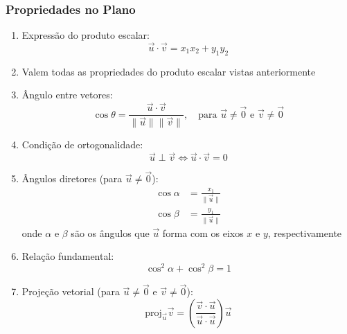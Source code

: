 \subsubsection*{Propriedades no Plano}
\begin{enumerate}[label=\alph*)]
  \item Expressão do produto escalar:
  \begin{equation}
    \vec{u} \cdot \vec{v} = x_1x_2 + y_1y_2
    \label{eq:produto_plano}
  \end{equation}
  
  \item Valem todas as propriedades do produto escalar vistas anteriormente
  
  \item Ângulo entre vetores:
  \begin{equation}
    \cos\theta = \frac{\vec{u} \cdot \vec{v}}{\|\vec{u}\|\|\vec{v}\|}, \quad \text{para } \vec{u} \neq \vec{0} \text{ e } \vec{v} \neq \vec{0}
    \label{eq:angulo_plano}
  \end{equation}
  
  \item Condição de ortogonalidade:
  \begin{equation}
    \vec{u} \perp \vec{v} \iff \vec{u} \cdot \vec{v} = 0
    \label{eq:ortog_plano}
  \end{equation}
  
  \item Ângulos diretores (para $\vec{u} \neq \vec{0}$):
  \begin{align}
    \cos\alpha &= \frac{x_1}{\|\vec{u}\|} \label{eq:cos_alpha} \\
    \cos\beta &= \frac{y_1}{\|\vec{u}\|} \label{eq:cos_beta}
  \end{align}
  onde $\alpha$ e $\beta$ são os ângulos que $\vec{u}$ forma com os eixos $x$ e $y$, respectivamente
  
  \item Relação fundamental:
  \begin{equation}
    \cos^2\alpha + \cos^2\beta = 1
    \label{eq:relacao_planar}
  \end{equation}
  
  \item Projeção vetorial (para $\vec{u} \neq \vec{0}$ e $\vec{v} \neq \vec{0}$):
  \begin{equation}
    \text{proj}_{\vec{u}} \vec{v} = \left( \frac{\vec{v} \cdot \vec{u}}{\vec{u} \cdot \vec{u}} \right) \vec{u}
    \label{eq:proj_plano}
  \end{equation}
\end{enumerate}

